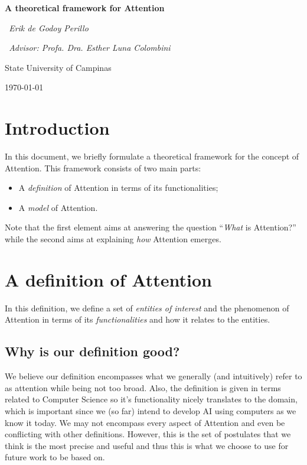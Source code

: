 \documentclass[11pt]{article}
\begin{document}

\begin{titlepage}
	\centering
	{\scshape\Large \par}
	\vspace{3.5cm}
	{\huge\bfseries A theoretical framework for Attention\par}
	\vspace{1cm}
	{\itshape~Erik de Godoy Perillo\par}%
    {\itshape~Advisor: Profa. Dra. Esther Luna Colombini\par}%
	\vspace{0.5cm}
	\vfill
	State University of Campinas
	\vfill
	{\large \today\par}
\end{titlepage}

\newpage




\section{Introduction}
In this document, we briefly formulate a theoretical framework for the concept of Attention.
This framework consists of two main parts:
\begin{itemize}
    \item A \emph{definition} of Attention in terms of its functionalities;
    \item A \emph{model} of Attention.
\end{itemize}
Note that the first element aims at answering the question ``\emph{What} is Attention?''
while the second aims at explaining \emph{how} Attention emerges.

\section{A definition of Attention}\label{sec:definition}
In this definition, we define a set of \emph{entities of interest} and the phenomenon of Attention in terms of
its \emph{functionalities} and how it relates to the entities.

\subsection{Why is our definition good?}
We believe our definition encompasses what we generally (and intuitively) refer to as attention while being not too broad.
Also, the definition is given in terms related to Computer Science so it’s functionality nicely translates to the domain,
which is important since we (so far) intend to develop AI using computers as we know it today.
We may not encompass every aspect of Attention and even be conflicting with other definitions.
However, this is the set of postulates that we think is the most precise and useful and thus this is
what we choose to use for future work to be based on.
\end{document}
